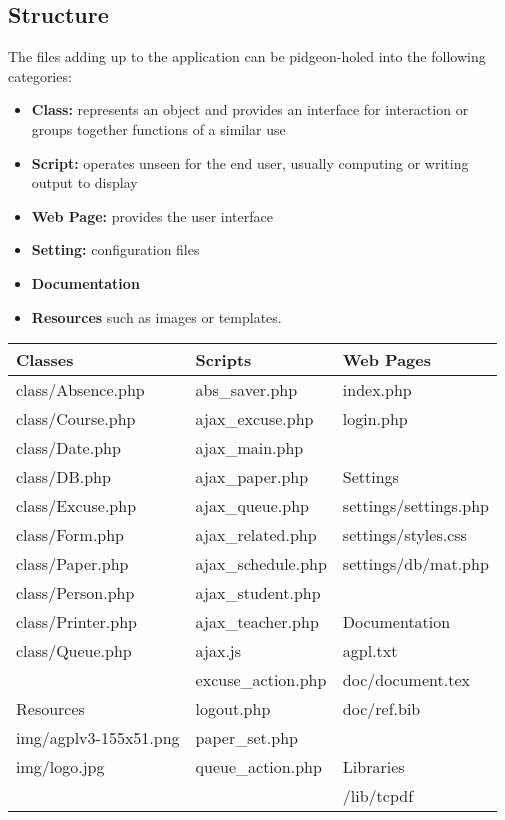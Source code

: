 \documentclass[12pt,a4paper,twoside,openany]{report}
\begin{document}
\subsection{Structure}
The files adding up to the application can be pidgeon-holed into the following
categories:
\begin{itemize}
  \item \textbf{Class:} represents an object and provides an interface for interaction
or groups together functions of a similar use
  \item \textbf{Script:} operates unseen for the end user, usually computing or writing output to display
  \item \textbf{Web Page:} provides the user interface
  \item \textbf{Setting:} configuration files
  \item \textbf{Documentation}
  \item \textbf{Resources} such as images or templates.
\end{itemize}
\begin{tabular}{ | l | l | l | }
\hline
\cellcolor[gray]{0.7}Classes & \cellcolor[gray]{0.7}Scripts & \cellcolor[gray]{0.7} Web Pages \\
\hline class/Absence.php & abs\_saver.php & index.php \\ \hline
class/Course.php & ajax\_excuse.php & login.php \\ \hline
class/Date.php & ajax\_main.php & \cellcolor{black}\\ \hline
class/DB.php & ajax\_paper.php & \cellcolor[gray]{0.7}Settings \\ \hline
class/Excuse.php & ajax\_queue.php & settings/settings.php \\ \hline
class/Form.php & ajax\_related.php & settings/styles.css \\ \hline
class/Paper.php & ajax\_schedule.php & settings/db/mat.php \\ \hline
class/Person.php & ajax\_student.php & \cellcolor{black}\\ \hline
class/Printer.php & ajax\_teacher.php & \cellcolor[gray]{0.7}Documentation \\ \hline
class/Queue.php & ajax.js & agpl.txt \\ \hline
\cellcolor{black} & excuse\_action.php & doc/document.tex \\ \hline
\cellcolor[gray]{0.7}Resources & logout.php & doc/ref.bib \\ \hline
img/agplv3-155x51.png & paper\_set.php & \cellcolor{black}\\ \hline
img/logo.jpg & queue\_action.php & \cellcolor[gray]{0.7}Libraries\\ \hline
\cellcolor{black} & \cellcolor{black} & /lib/tcpdf \\ \hline
\end{tabular}
\end{document}

